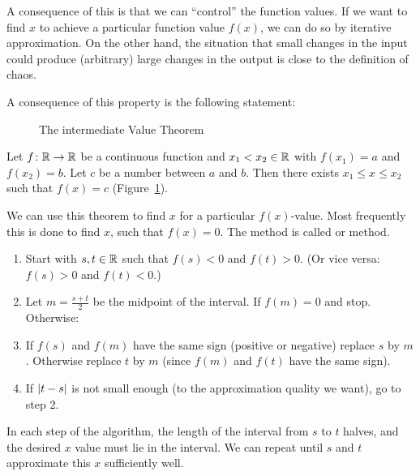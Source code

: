 A consequence of this is that we can ``control'' the function values. If we want to find
$x$ to achieve a particular function value $f(x)$, we can do so by iterative
approximation. On the other hand, the situation that small changes in the input could
produce (arbitrary) large changes in the output is close to the definition of chaos.
\smallskip

A consequence of this property is the following statement:
\begin{figure}
\begin{center}
\end{center}
\caption{The intermediate Value Theorem}
\label{figivt}
\end{figure}
\begin{thm}
Let $f\colon{\mathbb R}\to{\mathbb R}$ be a continuous function and $x_1<x_2\in{\mathbb R}$ with $f(x_1)=a$ and
$f(x_2)=b$. Let $c$ be a number between $a$ and $b$. Then there exists $x_1\le x\le x_2$
such that $f(x)=c$ (Figure~\ref{figivt}).
\end{thm}

We can use this theorem to find $x$ for a particular $f(x)$-value. Most frequently this
is done to find $x$, such that $f(x)=0$. The method is called  or  method.
\begin{enumerate}
\item
Start with $s,t\in{\mathbb R}$ such that $f(s)<0$ and $f(t)>0$. (Or vice versa: $f(s)>0$ and
$f(t)<0$.)
\item Let $m=\frac{s+t}{2}$ be the midpoint of the interval. If $f(m)=0$ and
stop. Otherwise:
\item If $f(s)$ and $f(m)$ have the same sign (positive or negative) replace $s$ by $m$.
Otherwise replace $t$ by $m$ (since $f(m)$ and $f(t)$ have the same sign).
\item If $\left|t-s\right|$ is not small enough (to the approximation quality we want), go to
step 2.
\end{enumerate}
In each step of the algorithm, the length of the interval from $s$ to $t$ halves, and
the desired $x$ value must lie in the interval. We can repeat until $s$ and $t$
approximate this $x$ sufficiently well.

